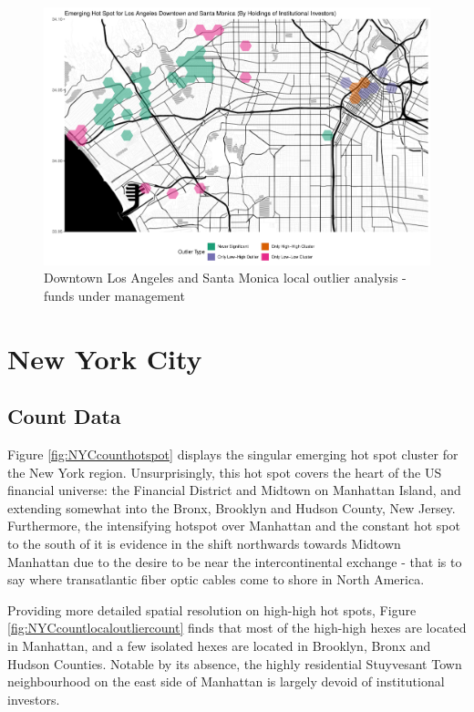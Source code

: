 \begin{figure}
	\centering
	\includegraphics[width=1\linewidth]{Figures/ChapterIV/LA_Money_LO_Downtown}
	\caption[Downtown Los Angeles and Santa Monica Local Outlier Analysis - Funds Under Management 2013-2018]{Downtown Los Angeles and Santa Monica local outlier analysis - funds under management}
	\label{fig:LAlocaloutlier_Downtown}
\end{figure}

\section{New York City}

\subsection{Count Data}

Figure \ref{fig:NYCcounthotspot} displays the singular emerging hot spot cluster for the New York region.  Unsurprisingly, this hot spot covers the heart of the US financial universe: the Financial District and Midtown on Manhattan Island, and extending somewhat into the Bronx, Brooklyn and Hudson County, New Jersey.   Furthermore, the intensifying hotspot over Manhattan and the constant hot spot to the south of it is evidence in the shift northwards towards Midtown Manhattan due to the desire to be near the intercontinental exchange - that is to say where transatlantic fiber optic cables come to shore in North America.     

Providing more detailed spatial resolution on high-high hot spots, Figure \ref{fig:NYCcountlocaloutliercount} finds that most of the high-high hexes are located in Manhattan, and a few isolated hexes are located in Brooklyn, Bronx and Hudson Counties.  Notable by its absence, the highly residential Stuyvesant Town neighbourhood on the east side of Manhattan is largely devoid of institutional investors.      



